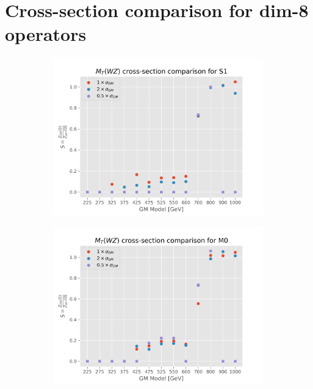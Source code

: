 \documentclass[../Bachelorarbeit.tex]{subfiles}
\begin{document}
\section{Cross-section comparison for dim-8 operators}
\label{sec:cross-section-comp}
\begin{figure}[h]
    \centering
    \begin{subfigure}{0.45\textwidth}
        \includegraphics[width=\textwidth]{Plots/gm_relevanze/MWZ_comparision_S1.png}

    \end{subfigure}
    \begin{subfigure}{0.45\textwidth}
        \includegraphics[width=\textwidth]{Plots/gm_relevanze/MWZ_comparision_M0.png}


\end{subfigure}
\end{figure}
\end{document}
